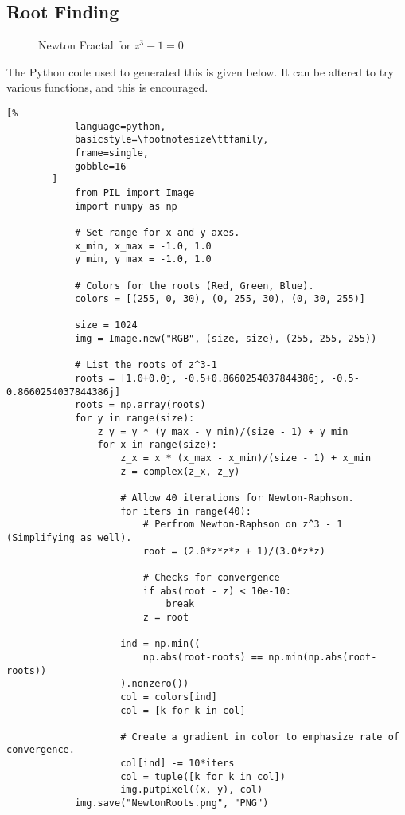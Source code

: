     \subsection{Root Finding}
        \begin{figure}[H]
            \centering
            \captionsetup{type=figure}
            \caption{Newton Fractal for $z^{3}-1=0$}
            \label{fig:Diff_Theory_Newton_Fractal}
        \end{figure}
        The Python code used to generated this is given below.
        It can be altered to try various functions, and this
        is encouraged.
        \newpage
        \begin{lstlisting}[%
            language=python,
            basicstyle=\footnotesize\ttfamily,
            frame=single,
            gobble=16
        ]
            from PIL import Image
            import numpy as np

            # Set range for x and y axes.
            x_min, x_max = -1.0, 1.0
            y_min, y_max = -1.0, 1.0

            # Colors for the roots (Red, Green, Blue).
            colors = [(255, 0, 30), (0, 255, 30), (0, 30, 255)]

            size = 1024
            img = Image.new("RGB", (size, size), (255, 255, 255))

            # List the roots of z^3-1
            roots = [1.0+0.0j, -0.5+0.8660254037844386j, -0.5-0.8660254037844386j]
            roots = np.array(roots)
            for y in range(size):
                z_y = y * (y_max - y_min)/(size - 1) + y_min
                for x in range(size):
                    z_x = x * (x_max - x_min)/(size - 1) + x_min
                    z = complex(z_x, z_y)

                    # Allow 40 iterations for Newton-Raphson.
                    for iters in range(40):
                        # Perfrom Newton-Raphson on z^3 - 1 (Simplifying as well).
                        root = (2.0*z*z*z + 1)/(3.0*z*z)

                        # Checks for convergence
                        if abs(root - z) < 10e-10:
                            break
                        z = root

                    ind = np.min((
                        np.abs(root-roots) == np.min(np.abs(root-roots))
                    ).nonzero())
                    col = colors[ind]
                    col = [k for k in col]

                    # Create a gradient in color to emphasize rate of convergence.
                    col[ind] -= 10*iters
                    col = tuple([k for k in col])
                    img.putpixel((x, y), col)
            img.save("NewtonRoots.png", "PNG")
        \end{lstlisting}
